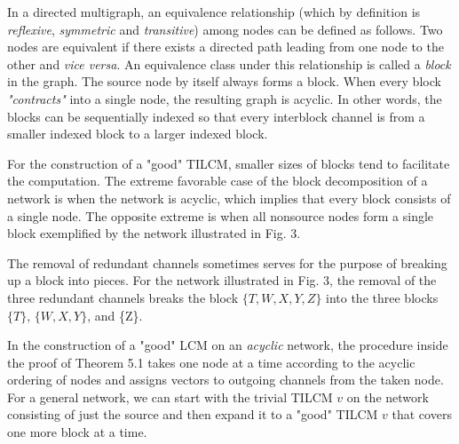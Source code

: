 \documentclass[journal]{IEEEtran}
\begin{document}
\par
In a directed multigraph, an equivalence relationship (which by definition is \emph{reflexive}, \emph{symmetric} and \emph{transitive}) among nodes can be defined as follows. Two nodes are equivalent if there exists a directed path leading from one node to the other and \emph{vice versa}. An equivalence class under this relationship is called a \emph{block} in the graph. The source node by itself always forms a block. When every block \emph{"contracts"} into a single node, the resulting graph is acyclic. In other words, the blocks can be sequentially indexed so that every interblock channel is from a smaller indexed block to a larger indexed block. 
\par 
For the construction of a "good" TILCM, smaller sizes of blocks tend to facilitate the computation. The extreme favorable case of the block decomposition of a network is when the network is acyclic, which implies that every block consists of a single node. The opposite extreme is when all nonsource nodes form a single block exemplified by the network illustrated in Fig. 3.
\par
The removal of redundant channels sometimes serves for the purpose of breaking up a block into pieces. For the network illustrated in Fig. 3, the removal of the three redundant channels breaks the block $\{T,W,X,Y,Z\}$ into the three blocks $\{T\}$, $\{W,X,Y\}$, and \{Z\}.
\par
In the construction of a "good" LCM on an \emph{acyclic} network, the procedure inside the proof of Theorem 5.1 takes one node at a time according to the acyclic ordering of nodes and assigns vectors to outgoing channels from the taken node. For a general network, we can start with the trivial TILCM $v$ on the network consisting of just the source and then expand it to a "good" TILCM $v$ that covers one more block at a time.
\par
\end{document}
